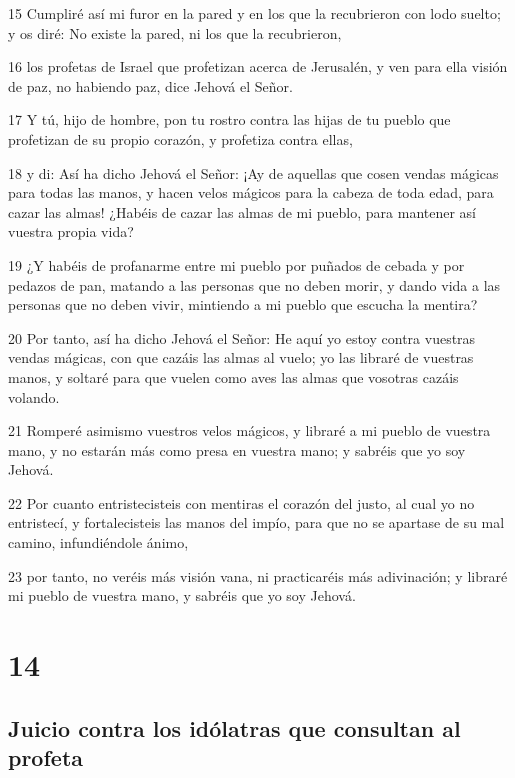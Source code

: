 \par 15 Cumpliré así mi furor en la pared y en los que la recubrieron con lodo suelto; y os diré: No existe la pared, ni los que la recubrieron,
\par 16 los profetas de Israel que profetizan acerca de Jerusalén, y ven para ella visión de paz, no habiendo paz, dice Jehová el Señor.
\par 17 Y tú, hijo de hombre, pon tu rostro contra las hijas de tu pueblo que profetizan de su propio corazón, y profetiza contra ellas,
\par 18 y di: Así ha dicho Jehová el Señor: ¡Ay de aquellas que cosen vendas mágicas para todas las manos, y hacen velos mágicos para la cabeza de toda edad, para cazar las almas! ¿Habéis de cazar las almas de mi pueblo, para mantener así vuestra propia vida?
\par 19 ¿Y habéis de profanarme entre mi pueblo por puñados de cebada y por pedazos de pan, matando a las personas que no deben morir, y dando vida a las personas que no deben vivir, mintiendo a mi pueblo que escucha la mentira?
\par 20 Por tanto, así ha dicho Jehová el Señor: He aquí yo estoy contra vuestras vendas mágicas, con que cazáis las almas al vuelo; yo las libraré de vuestras manos, y soltaré para que vuelen como aves las almas que vosotras cazáis volando.
\par 21 Romperé asimismo vuestros velos mágicos, y libraré a mi pueblo de vuestra mano, y no estarán más como presa en vuestra mano; y sabréis que yo soy Jehová.
\par 22 Por cuanto entristecisteis con mentiras el corazón del justo, al cual yo no entristecí, y fortalecisteis las manos del impío, para que no se apartase de su mal camino, infundiéndole ánimo,
\par 23 por tanto, no veréis más visión vana, ni practicaréis más adivinación; y libraré mi pueblo de vuestra mano, y sabréis que yo soy Jehová.

\chapter{14}

\section*{Juicio contra los idólatras que consultan al profeta}

